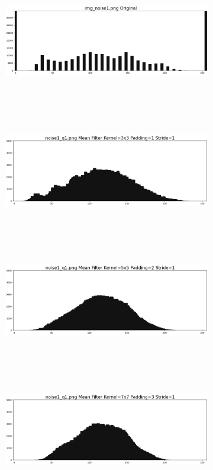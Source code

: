 \documentclass[12pt,a4paper]{report}
\begin{document}
\begin{figure}[!htb]
  \begin{minipage}{\linewidth}
    \centering
    \begin{subfigure}{1\textwidth}
      \includegraphics[height=5.3cm]{result_img/noise1_his.png}
    \end{subfigure}
    \begin{subfigure}{1\textwidth}
      \includegraphics[height=5.3cm]{output/noise1_q1_K3P1_his.png}
    \end{subfigure}

    \begin{subfigure}{1\textwidth}
      \includegraphics[height=5.3cm]{output/noise1_q1_K5P2_his.png}
    \end{subfigure}
    \begin{subfigure}{1\textwidth}
      \includegraphics[height=5.3cm]{output/noise1_q1_K7P3_his.png}
    \end{subfigure}
    

\end{minipage}
\end{figure}
\end{document}
